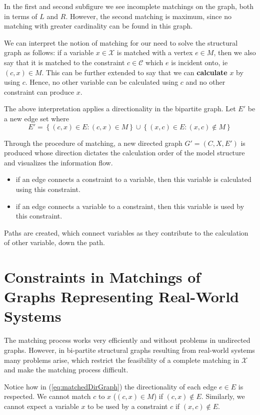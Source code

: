 In the first and second subfigure we see incomplete matchings on the graph, both in terms of $L$ and $R$. However, the second matching is maximum, since no matching with greater cardinality can be found in this graph.

We can interpret the notion of matching for our need to solve the structural graph as follows: if a variable $x \in \mathcal{X}$ is matched with a vertex $e \in M$, then we also say that it is matched to the constraint $c \in \mathcal{C}$ which $e$ is incident onto, ie $(c,x) \in M$. This can be further extended to say that we can \textbf{calculate} $x$ by using $c$. Hence, no other variable can be calculated using $c$ and no other constraint can produce $x$.

The above interpretation applies a directionality in the bipartite graph. Let $E'$ be a new edge set where 
\begin{equation} \label{eq:matchedDirGraph}
E' = \left\{(c,x) \in E : (c,x) \in M\right\} \cup \left\{(x,c) \in E : (x,c) \notin M\right\}
\end{equation}

Through the procedure of matching, a new directed graph $G'=(C,X,E')$ is produced whose direction dictates the calculation order of the model structure and visualizes the information flow. 
\begin{itemize}
\item if an edge connects a constraint to a variable, then this variable is calculated using this constraint.
\item if an edge connects a variable to a constraint, then this variable is used by this constraint.
\end{itemize}

Paths are created, which connect variables as they contribute to the calculation of other variable, down the path.

\section{Constraints in Matchings of Graphs Representing Real-World Systems}

The matching process works very efficiently and without problems in undirected graphs. However, in bi-partite structural graphs resulting from real-world systems many problems arise, which restrict the feasibility of a complete matching in $\mathcal{X}$ and make the matching process difficult.

Notice how in (\ref{eq:matchedDirGraph}) the directionality of each edge $e \in E$ is respected. We cannot match $c$ to $x$ ($(c,x) \in M$) if $(c,x) \notin E$. Similarly, we cannot expect a variable $x$ to be used by a constraint $c$ if $(x,c) \notin E$.

